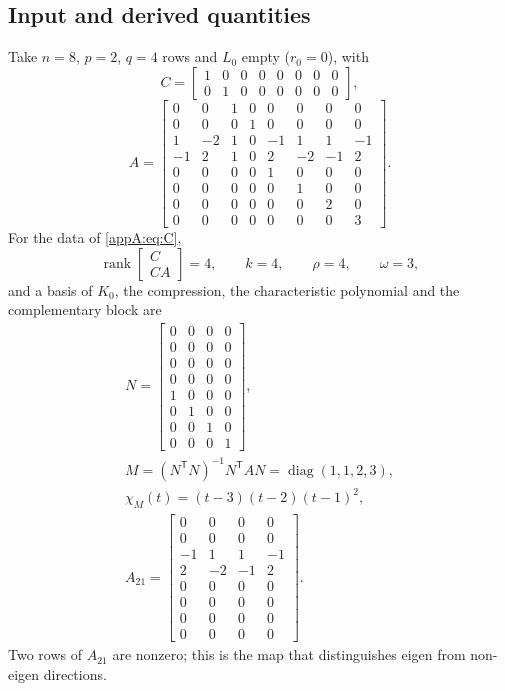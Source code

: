 \documentclass[journal]{IEEEtran}
\theoremstyle{plainn}
\theoremstyle{remark}
\newcommand{\rank}{\operatorname{rank}}
\begin{document}
\subsection{Input and derived quantities}
\label{appA:input}\label{appA:derived}
Take $n=8$, $p=2$, $q=4$ rows and $L_0$ empty ($r_0=0$), with
\begin{equation}
\label{appA:eq:C}
C=\begin{bmatrix}1&0&0&0&0&0&0&0\\0&1&0&0&0&0&0&0\end{bmatrix},
\end{equation}
\begin{equation}
\label{appA:eq:A}
A=\begin{bmatrix}
0&0&1&0&0&0&0&0\\0&0&0&1&0&0&0&0\\
1&-2&1&0&-1&1&1&-1\\-1&2&1&0&2&-2&-1&2\\
0&0&0&0&1&0&0&0\\0&0&0&0&0&1&0&0\\
0&0&0&0&0&0&2&0\\0&0&0&0&0&0&0&3
\end{bmatrix}.
\end{equation}
For the data of \eqref{appA:eq:C},
\begin{equation}\label{appA:eq:rank}
\rank\begin{bmatrix}C\\ CA\end{bmatrix}=4,\qquad k=4,\qquad \rho=4,\qquad \omega=3,
\end{equation}
and a basis of $K_0$, the compression, the characteristic polynomial and the complementary block are
\begin{gather}
\label{appA:eq:N}
N=\begin{bmatrix}
0&0&0&0\\0&0&0&0\\0&0&0&0\\0&0&0&0\\
1&0&0&0\\0&1&0&0\\0&0&1&0\\0&0&0&1
\end{bmatrix},\\
M=(N^{\mathsf T}N)^{-1}N^{\mathsf T}AN=\operatorname{diag}(1,1,2,3),\\
\label{appA:eq:chi}
\chi_M(t)=(t-3)(t-2)(t-1)^2,\\
A_{21}=\begin{bmatrix}
0&0&0&0\\0&0&0&0\\-1&1&1&-1\\2&-2&-1&2\\
0&0&0&0\\0&0&0&0\\0&0&0&0\\0&0&0&0
\end{bmatrix}.
\end{gather}
Two rows of $A_{21}$ are nonzero; this is the map that distinguishes eigen from non-eigen directions.
\end{document}
